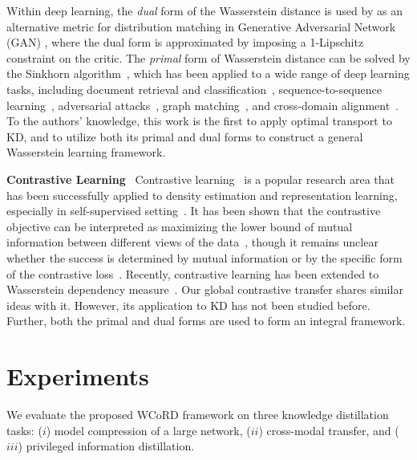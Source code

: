 \documentclass[final]{cvpr}
\theoremstyle{definition}
\begin{document}
Within deep learning, the \emph{dual} form of the Wasserstein distance is used by \cite{wgan, gulrajani2017improved} as an alternative metric for distribution matching in Generative Adversarial Network (GAN) \cite{goodfellow2014generative}, where the dual form is approximated by imposing a 1-Lipschitz constraint on the critic. 
The \emph{primal} form of Wasserstein distance can be solved by the Sinkhorn algorithm~\cite{cuturi2013sinkhorn}, which has been applied to a wide range of deep learning tasks, including document retrieval and classification~\cite{kusner2015word}, sequence-to-sequence learning~\cite{chen2019improving}, adversarial attacks~\cite{wong2019wasserstein}, graph matching~\cite{xu2019gromov}, and cross-domain alignment~\cite{chen2020graph}.
To the authors' knowledge, this work is the first to apply optimal transport to KD, and to utilize both its primal and dual forms to construct a general Wasserstein learning framework. 




\vspace{5pt}
\noindent\textbf{Contrastive Learning} \,
Contrastive learning~\cite{gutmann2010noise,arora2019theoretical} is a popular research area that has been successfully applied to density estimation and representation learning, especially in self-supervised setting~\cite{he2019momentum,chen2020simple}. It has been shown that the contrastive objective can be interpreted as maximizing the lower bound of mutual information between different views of the data~\cite{hjelm2018learning,oord2018representation,bachman2019learning,henaff2019data}, though it remains unclear whether the success is determined by mutual information or by the specific form of the contrastive loss~\cite{tschannen2019mutual}.  Recently, contrastive learning has been extended to Wasserstein dependency measure~\cite{ozair2019wasserstein}. Our global  contrastive transfer shares similar ideas with it. However, its application to KD has not been studied before. Further, both the primal and dual forms are used to form an integral framework.

\section{Experiments}
We evaluate the proposed WCoRD framework on three knowledge distillation tasks: ($i$) model compression of a large network, ($ii$) cross-modal transfer, and ($iii$) privileged information distillation. 
\end{document}
